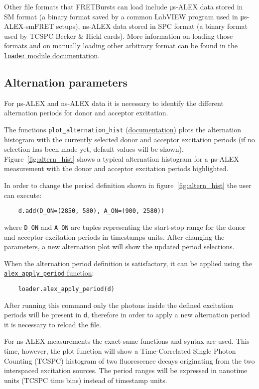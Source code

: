 Other file formats that FRETBursts can load include μs-ALEX data stored in SM format
(a binary format saved by a common LabVIEW program used in μs-ALEX-smFRET setups), 
ns-ALEX data stored in SPC format (a binary format used by TCSPC Becker \& Hickl cards).
More information on loading those formats and on manually loading other arbitrary format
can be found in the 
\href{http://fretbursts.readthedocs.org/en/latest/loader.html}{\texttt{loader} module documentation}.


\subsection{Alternation parameters}
\label{sec:alternation}

For µs-ALEX and ns-ALEX data it is necessary to identify the different 
alternation periods for donor and acceptor excitation.

The functions 
\verb|plot_alternation_hist| (\href{http://fretbursts.readthedocs.org/en/latest/plots.html#fretbursts.burst\_plot.plot\_alternation\_hist}{documentation})
plots the alternation histogram 
with the currently selected donor and acceptor excitation periods
(if no selection has been made yet, default values will be shown).
Figure~\ref{fig:altern_hist} shows a typical alternation histogram for
a µs-ALEX measurement with the donor and acceptor excitation periods highlighted.

In order to change the period definition shown in figure~\ref{fig:altern_hist}
the user can execute:

\begin{verbatim}
    d.add(D_ON=(2850, 580), A_ON=(900, 2580))
\end{verbatim}

where \verb|D_ON| and \verb|A_ON| are tuples representing 
the start-stop range for the donor and acceptor excitation periods 
in timestamps units. After changing the parameters, a new alternation plot will show the updated period selections.

When the alternation period definition is satisfactory, it can
be applied using the 
\href{http://fretbursts.readthedocs.org/en/latest/loader.html#fretbursts.loader.alex_apply_period}{\texttt{alex\_apply\_period} function}:

\begin{verbatim}
    loader.alex_apply_period(d)
\end{verbatim}

After running this command only the photons inside the defined excitation periods
will be present in \verb|d|, therefore in order to apply a new alternation period 
it is necessary to reload the file.

For ns-ALEX measurements the exact same functions and syntax are used.
This time, however, the plot function will show a Time-Correlated Single Photon Counting (TCSPC) histogram of two fluorescence decays originating from the two interspaced excitation sources. The period ranges will be expressed in nanotime units (TCSPC time bins) instead of 
timestamp units.
